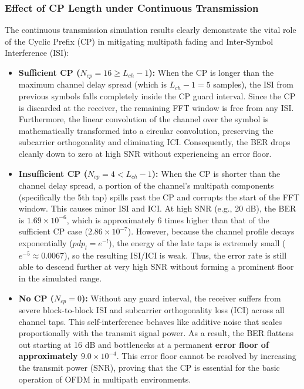 \documentclass[a4paper]{article}
\begin{document}
\subsubsection{Effect of CP Length under Continuous Transmission}
The continuous transmission simulation results clearly demonstrate the vital role of the Cyclic Prefix (CP) in mitigating multipath fading and Inter-Symbol Interference (ISI):
\begin{itemize}
    \item \textbf{Sufficient CP ($N_{cp}=16 \ge L_{ch}-1$):} When the CP is longer than the maximum channel delay spread (which is $L_{ch}-1 = 5$ samples), the ISI from previous symbols falls completely inside the CP guard interval. Since the CP is discarded at the receiver, the remaining FFT window is free from any ISI. Furthermore, the linear convolution of the channel over the symbol is mathematically transformed into a circular convolution, preserving the subcarrier orthogonality and eliminating ICI. Consequently, the BER drops cleanly down to zero at high SNR without experiencing an error floor.
    \item \textbf{Insufficient CP ($N_{cp}=4 < L_{ch}-1$):} When the CP is shorter than the channel delay spread, a portion of the channel's multipath components (specifically the 5th tap) spills past the CP and corrupts the start of the FFT window. This causes minor ISI and ICI. At high SNR (e.g., 20 dB), the BER is $1.69 \times 10^{-6}$, which is approximately 6 times higher than that of the sufficient CP case ($2.86 \times 10^{-7}$). However, because the channel profile decays exponentially ($pdp_l = e^{-l}$), the energy of the late taps is extremely small ($e^{-5} \approx 0.0067$), so the resulting ISI/ICI is weak. Thus, the error rate is still able to descend further at very high SNR without forming a prominent floor in the simulated range.
    \item \textbf{No CP ($N_{cp}=0$):} Without any guard interval, the receiver suffers from severe block-to-block ISI and subcarrier orthogonality loss (ICI) across all channel taps. This self-interference behaves like additive noise that scales proportionally with the transmit signal power. As a result, the BER flattens out starting at 16 dB and bottlenecks at a permanent \textbf{error floor of approximately $9.0 \times 10^{-4}$}. This error floor cannot be resolved by increasing the transmit power (SNR), proving that the CP is essential for the basic operation of OFDM in multipath environments.
\end{itemize}
\end{document}
